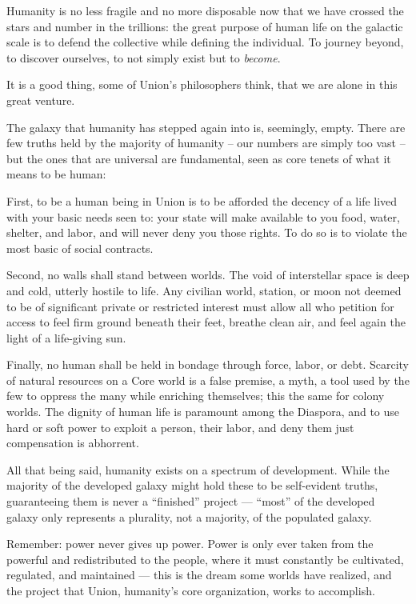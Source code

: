 Humanity is no less fragile and no more disposable now that we have crossed the stars and
number in the trillions: the great purpose of human life on the galactic scale is to defend the
collective while defining the individual. To journey beyond, to discover ourselves, to not simply
exist but to \textit{become}.


It is a good thing, some of Union’s philosophers think, that we are alone in this great venture.


The galaxy that humanity has stepped again into is, seemingly, empty. There are few truths held
by the majority of humanity -- our numbers are simply too vast -- but the ones that are universal
are fundamental, seen as core tenets of what it means to be human:


First, to be a human being in Union is to be afforded the decency of a life lived with your basic
needs seen to: your state will make available to you food, water, shelter, and labor, and will never
deny you those rights. To do so is to violate the most basic of social contracts.


Second, no walls shall stand between worlds. The void of interstellar space is deep and cold,
utterly hostile to life. Any civilian world, station, or moon not deemed to be of significant private
or restricted interest must allow all who petition for access to feel firm ground beneath their feet,
breathe clean air, and feel again the light of a life-giving sun.


Finally, no human shall be held in bondage through force, labor, or debt. Scarcity of natural
resources on a Core world is a false premise, a myth, a tool used by the few to oppress the many
while enriching themselves; this the same for colony worlds. The dignity of human life is
paramount among the Diaspora, and to use hard or soft power to exploit a person, their labor,
and deny them just compensation is abhorrent.


All that being said, humanity exists on a spectrum of development. While the majority of the
developed galaxy might hold these to be self-evident truths, guaranteeing them is never a
“finished” project — “most” of the developed galaxy only represents a plurality, not a majority, of
the populated galaxy.


Remember: power never gives up power. Power is only ever taken from the powerful and
redistributed to the people, where it must constantly be cultivated, regulated, and maintained —
this is the dream some worlds have realized, and the project that Union, humanity’s core
organization, works to accomplish.


